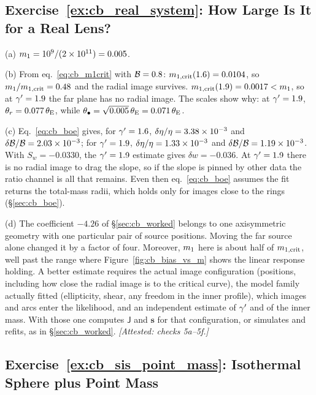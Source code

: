 \subsection*{Exercise~\ref{ex:cb_real_system}: How Large Is It for a Real Lens?}

(a) $m_1=10^{9}/(2\times10^{11})=0.005$.

(b) From eq.~\eqref{eq:cb_m1crit} with $\mathcal{B}=0.8$:
$m_{1,\rm crit}(1.6)=0.0104$, so $m_1/m_{1,\rm crit}=0.48$ and
the radial image survives. $m_{1,\rm crit}(1.9)=0.0017<m_1$, so at
$\gamma'=1.9$ the far plane has no radial image. The scales show why: at
$\gamma'=1.9$, $\theta_r=0.077\,\theta_{\mathrm{E}}$, while
$\theta_{\bullet}=\sqrt{0.005}\,\theta_{\mathrm{E}}=0.071\,\theta_{\mathrm{E}}$.

(c) Eq.~\eqref{eq:cb_boe} gives, for $\gamma'=1.6$,
$\delta\eta/\eta=3.38\times10^{-3}$ and
$\delta\mathcal{B}/\mathcal{B}=2.03\times10^{-3}$; for $\gamma'=1.9$,
$\delta\eta/\eta=1.33\times10^{-3}$ and
$\delta\mathcal{B}/\mathcal{B}=1.19\times10^{-3}$. With $S_w=-0.0330$, the $\gamma'=1.9$
estimate gives $\delta w=-0.036$. At $\gamma'=1.9$ there is no radial image
to drag the slope, so if the slope is pinned by other data the ratio
channel is all that remains. Even then eq.~\eqref{eq:cb_boe} assumes the
fit returns the total-mass radii, which holds only for images close to
the rings (\S\ref{sec:cb_boe}).

(d) The coefficient $-4.26$ of \S\ref{sec:cb_worked} belongs to
one axisymmetric geometry with one particular pair of source positions.
Moving the far source alone changed it by a factor of four. Moreover,
$m_1$ here is about half of $m_{1,\rm crit}$, well past the range
where Figure~\ref{fig:cb_bias_vs_m} shows the linear response holding.
A better estimate requires the actual image configuration (positions,
including how close the radial image is to the critical curve), the
model family actually fitted (ellipticity, shear, any freedom in the
inner profile), which images and arcs enter the likelihood, and an
independent estimate of $\gamma'$ and of the inner mass. With those one
computes $\mathsf{J}$ and $\mathbf{s}$ for that configuration, or
simulates and refits, as in \S\ref{sec:cb_worked}.
\emph{[Attested: checks 5a--5f.]}

\subsection*{Exercise~\ref{ex:cb_sis_point_mass}: Isothermal Sphere plus Point Mass}


